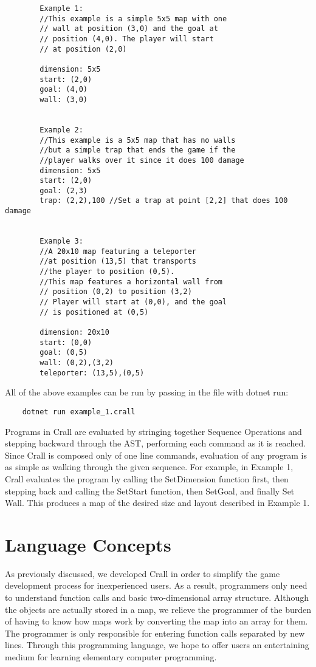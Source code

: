 \documentclass[10pt]{article}
\begin{document}
    \begin{verbatim}
        Example 1: 
        //This example is a simple 5x5 map with one 
        // wall at position (3,0) and the goal at 
        // position (4,0). The player will start
        // at position (2,0)
        
        dimension: 5x5
        start: (2,0)
        goal: (4,0)
        wall: (3,0)

    
        Example 2: 
        //This example is a 5x5 map that has no walls 
        //but a simple trap that ends the game if the 
        //player walks over it since it does 100 damage
        dimension: 5x5
        start: (2,0)
        goal: (2,3)
        trap: (2,2),100 //Set a trap at point [2,2] that does 100 damage


        Example 3: 
        //A 20x10 map featuring a teleporter
        //at position (13,5) that transports
        //the player to position (0,5). 
        //This map features a horizontal wall from
        // position (0,2) to position (3,2)
        // Player will start at (0,0), and the goal
        // is positioned at (0,5)
        
        dimension: 20x10
        start: (0,0)
        goal: (0,5)
        wall: (0,2),(3,2)
        teleporter: (13,5),(0,5)
        \end{verbatim}
        
    All of the above examples can be run by passing in the file with dotnet run:
    \begin{verbatim}
    dotnet run example_1.crall    
    \end{verbatim}
    
    Programs in Crall are evaluated by stringing together Sequence Operations and stepping backward through the AST, performing each command as it is reached. Since Crall is composed only of one line commands, evaluation of any program is as simple as walking through the given sequence. For example, in Example 1, Crall evaluates the program by calling the SetDimension function first, then stepping back and calling the SetStart function, then SetGoal, and finally Set Wall. This produces a map of the desired size and layout described in Example 1.
    
    \section{Language Concepts}
    
    As previously discussed, we developed Crall in order to simplify the game development process for inexperienced users. As a result, programmers only need to understand function calls and basic two-dimensional array structure. Although the objects are actually stored in a map, we relieve the programmer of the burden of having to know how maps work by converting the map into an array for them. The programmer is only responsible for entering function calls separated by new lines. Through this programming language, we hope to offer users an entertaining medium for learning elementary computer programming.
    
\end{document}
